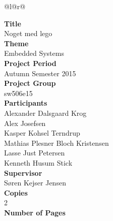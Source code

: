 
\begin{nopagebreak}
{\begin{center}
    \begin{tabular*}{\textwidth}{@{}l@{\extracolsep{\fill}}r@{}}
        \\
        \begin{minipage}[t]{0.49\textwidth}
            \textbf{Title}\\
            Noget med lego\\

            \textbf{Theme}\\
            Embedded Systems\\

            \textbf{Project Period}\\
            Autumn Semester 2015\\

            \textbf{Project Group}\\
            sw506e15\\

            \textbf{Participants}\\
            Alexander Dalsgaard Krog\\
            Alex Josefsen\\
            Kasper Kohsel Terndrup\\
            Mathias Plesner Bloch Kristensen\\
            Lasse Just Petersen\\
            Kenneth Husum Stick\\

            \textbf{Supervisor}\\
            Søren Kejser Jensen\\

            \textbf{Copies}\\
            2\\ %

            \textbf{Number of Pages}\\
            \pageref{LastPage}\\
            

\end{minipage}
\end{tabular*}
\end{center}}
\end{nopagebreak}
